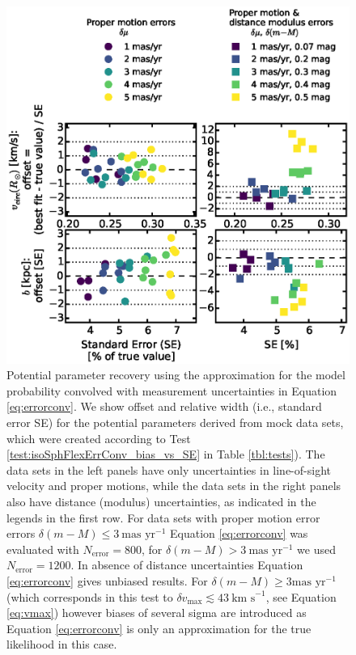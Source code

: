 \begin{figure}[!htbp]
\centering
\includegraphics[width=\columnwidth]{figs/isoSphFlexErrConv_bias_vs_SE.eps}
\caption{Potential parameter recovery using the approximation for the model probability convolved with measurement uncertainties in Equation \ref{eq:errorconv}. We show  \pdf{} offset and relative width (i.e., standard error SE) for the potential parameters derived from mock data sets, which were created according to Test \ref{test:isoSphFlexErrConv_bias_vs_SE} in Table \ref{tbl:tests}). The data sets in the left panels have only uncertainties in line-of-sight velocity and proper motions, while the data sets in the right panels also have distance (modulus) uncertainties, as indicated in the legends in the first row. For data sets with proper motion error errors $\delta(m-M) \leq 3 \ \text{mas yr}^{-1}$ Equation \ref{eq:errorconv} was evaluated with $N_\text{error}=800$, for $\delta(m-M) > 3 \ \text{mas yr}^{-1}$ we used $N_\text{error}=1200$. In absence of distance uncertainties Equation \ref{eq:errorconv} gives unbiased results. For $\delta(m-M) \geq 3 \text{mas yr}^{-1}$ (which corresponds in this test to $\delta v_\text{max} \lesssim 43 \ \text{km s}^{-1}$, see Equation \ref{eq:vmax}) however biases of several sigma are introduced as Equation \ref{eq:errorconv} is only an approximation for the true likelihood in this case. }
\label{fig:isoSphFlexErrConv_bias_vs_SE}
\end{figure}

